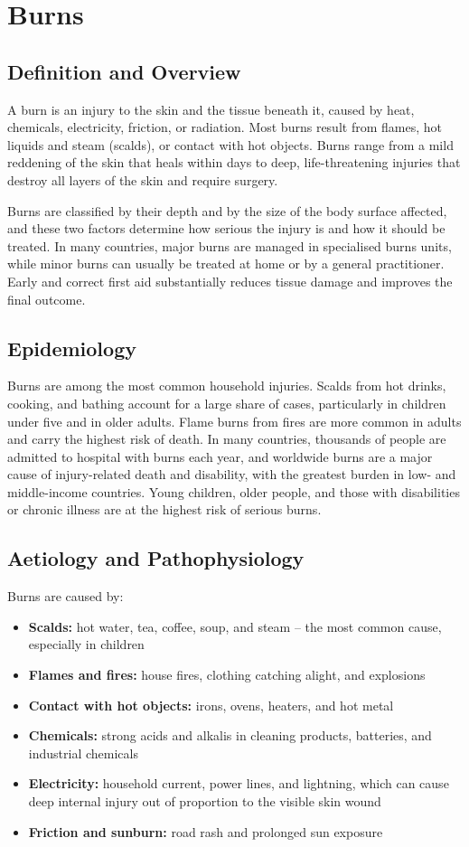 \chapter{Burns}

\section*{Definition and Overview}
A burn is an injury to the skin and the tissue beneath it, caused by heat, chemicals, electricity, friction, or radiation. Most burns result from flames, hot liquids and steam (scalds), or contact with hot objects. Burns range from a mild reddening of the skin that heals within days to deep, life-threatening injuries that destroy all layers of the skin and require surgery.

Burns are classified by their depth and by the size of the body surface affected, and these two factors determine how serious the injury is and how it should be treated. In many countries, major burns are managed in specialised burns units, while minor burns can usually be treated at home or by a general practitioner. Early and correct first aid substantially reduces tissue damage and improves the final outcome.

\section*{Epidemiology}
Burns are among the most common household injuries. Scalds from hot drinks, cooking, and bathing account for a large share of cases, particularly in children under five and in older adults. Flame burns from fires are more common in adults and carry the highest risk of death. In many countries, thousands of people are admitted to hospital with burns each year, and worldwide burns are a major cause of injury-related death and disability, with the greatest burden in low- and middle-income countries. Young children, older people, and those with disabilities or chronic illness are at the highest risk of serious burns.

\section*{Aetiology and Pathophysiology}
Burns are caused by:
\begin{itemize}
    \item \textbf{Scalds:} hot water, tea, coffee, soup, and steam -- the most common cause, especially in children
    \item \textbf{Flames and fires:} house fires, clothing catching alight, and explosions
    \item \textbf{Contact with hot objects:} irons, ovens, heaters, and hot metal
    \item \textbf{Chemicals:} strong acids and alkalis in cleaning products, batteries, and industrial chemicals
    \item \textbf{Electricity:} household current, power lines, and lightning, which can cause deep internal injury out of proportion to the visible skin wound
    \item \textbf{Friction and sunburn:} road rash and prolonged sun exposure
\end{itemize}

